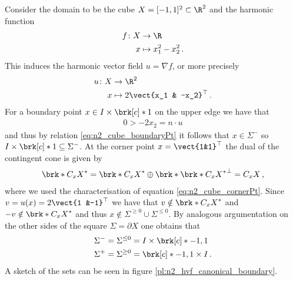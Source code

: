\begin{example}\label{ex:n2_hvf_canonical}
  Consider the domain to be the cube $X=[-1,1]^2\subset\R^2$
  and the harmonic function
  \begin{equation}
    \begin{aligned}
    f\colon X&\to\R \\
    x&\mapsto x_1^2-x_2^2\,.\label{eq:n2_hf_canonical}
    \end{aligned}
  \end{equation}
  This induces the harmonic vector field $u=\nabla f$, or more precisely
  \begin{equation}
    \begin{aligned}
    u\colon X&\to\R^2 \\
    x&\mapsto 2\vect{x_1 & -x_2}^\top\,.\label{eq:n2_hvf_canonical}
    \end{aligned}
  \end{equation}
  For a boundary point $x\in I\times\brk[c]*{1}$ on the upper edge we have that
  \begin{align*}
    0>  -2x_2=n\cdot u
  \end{align*}
  and thus by relation \eqref{eq:n2_cube_boundaryPt} it follows that $x\in\Sigma^{-}$
  so $I\times\brk[c]*{1}\subseteq\Sigma^{-}$.
  At the corner point $x=\vect{1&1}^\top$ the dual of the contingent cone is given by
  \begin{align}
    \brk*{C_xX}^*=\brk*{C_xX}^*\oplus\brk*{\brk*{C_xX}^*}^\perp =C_xX\label{eq:n2_hvf_canonical_CxX}\,,
  \end{align}
  where we used the characterisation of equation \eqref{eq:n2_cube_cornerPt}.
  Since $v=u(x)=2\vect{1 &-1}^\top$ we have that $v\notin\brk*{C_xX}^*$ and $-v\notin\brk*{C_xX}^*$
  and thus $x\notin\Sigma^{\geq0}\cup\Sigma^{\leq0}$.
  By analogous argumentation on the other sides of the square $\Sigma=\partial X$
  one obtains that
  \begin{align*}
    \Sigma^-=\Sigma^{\leq0}&=I\times\brk[c]*{-1,1}\\
    \Sigma^+=\Sigma^{\geq0}&=\brk[c]*{-1,1}\times I\,.
  \end{align*}
  A sketch of the sets can be seen in figure \ref{pl:n2_hvf_canonical_boundary}.
\end{example}

